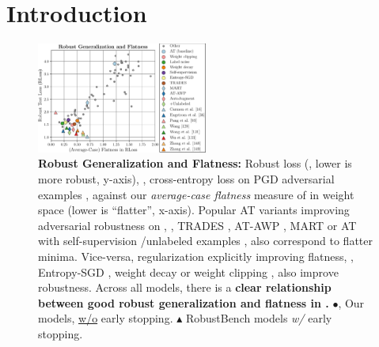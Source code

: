 \section{Introduction}
\label{sec:introduction}

\begin{figure}[t]
	\centering
	\vspace*{-0.2cm}
	\hspace*{-0.25cm}
	\includegraphics[width=0.5\textwidth]{plots_contributions_arxiv}
	\vspace*{-18px}
	\caption{\textbf{Robust Generalization and Flatness:} Robust loss (\RCE, lower is more robust, y-axis), \ie, cross-entropy loss on PGD adversarial examples \cite{MadryICLR2018}, against our \emph{average-case flatness} measure of \RCE in weight space (lower is ``flatter'', x-axis).
	Popular AT variants improving adversarial robustness on \CifarT, \eg, TRADES \cite{ZhangICML2019}, AT-AWP \cite{WuNIPS2020}, MART \cite{WangICLR2020} or AT with self-supervision \cite{HendrycksNIPS2019}/unlabeled examples \cite{CarmonNIPS2019}, also correspond to flatter minima. Vice-versa, regularization explicitly improving flatness, \eg, Entropy-SGD \cite{ChaudhariICLR2017}, weight decay or weight clipping \cite{StutzMLSYS2021}, also improve robustness.
	Across all models, there is a \textbf{clear relationship between good robust generalization and flatness in \RCE.}
	{\LARGE$\bullet$},\raisebox{0.5mm}{$\mathbin{\blacklozenge}$} Our models, \underline{w/o} early stopping.
	{\large$\blacktriangle$} RobustBench \cite{CroceARXIV2020b} models \emph{w/} early stopping.}
	\label{fig:introduction}
	\vspace*{-6px} 
\end{figure}

